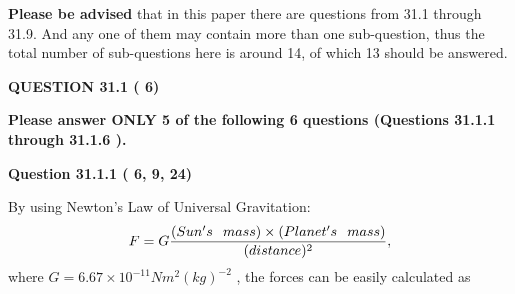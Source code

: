 \documentclass[12pt]{article}
\begin{document}
{\textbf{\large{Please be advised}}} that in this paper there are questions from
31.1 through
31.9.
And any one of them may contain more than one sub-question, thus the total number
of sub-questions here is around 14, of which
13 should be answered.
 
\vspace{0.3in}
 
 
   
   
  
\vspace{0.2in}
  
{\textbf{\Large{QUESTION
31.1 
 (          6)
}}}
  
  
{\textbf{\Large{Please answer ONLY  %
           5 %
 of the following  %
           6 %
 questions (Questions  %
31.1.1 %
 through  %
31.1.6 %
 ). }}}
   
   
  
\vspace{0.2in}
  
{\textbf{\Large{Question
31.1.1 
 (          6,          9,         24)
}}}
  
  
 
 
\noindent{}

By using Newton's Law of Universal Gravitation:
\[
F=G \frac{(Sun's \hspace{0.1in} mass) \times (Planet's \hspace{0.1in} mass)} { (distance)^2},
\]
where
$ G= %
6.67 \times 10^{-11} N m^{2}(kg)^{-2}$ , the forces can be easily calculated as
 
\vspace{0.2in}
 
\end{document}
